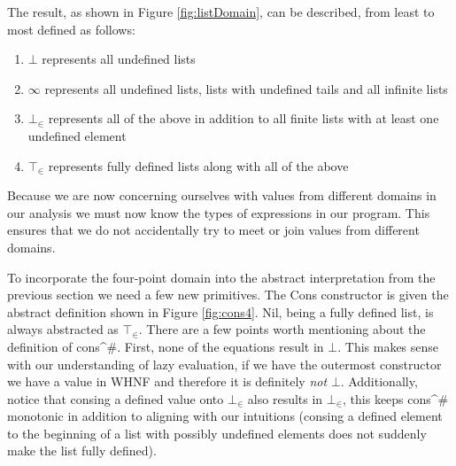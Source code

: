 The result, as shown in Figure \ref{fig:listDomain}, can be described, from least
to most defined as follows:

\begin{enumerate}
    \item $\bot$ represents all undefined lists
    \item $\infty$ represents all undefined lists, lists  with undefined tails
        and all infinite lists
    \item $\bot_{\in}$ represents all of the above in addition to all finite
        lists with at least one undefined element
    \item $\top_{\in}$ represents fully defined lists along with all of the above
\end{enumerate}


Because we are now concerning ourselves with values from different domains in
our analysis we must now know the types of expressions in our program. This
ensures that we do not accidentally try to \<meet\> or \<join\> values from
different domains. 

To incorporate the four-point domain into the abstract interpretation from the
previous section we need a few new primitives. The \<Cons\> constructor is
given the abstract definition shown in Figure \ref{fig:cons4}. \<Nil\>, being a
fully defined list, is always abstracted as $\top_{\in}$.  There are a few
points worth mentioning about the definition of \<cons^{\#}\>.  First, none of
the equations result in $\bot$.  This makes sense with our understanding of
lazy evaluation, if we have the outermost constructor we have a value in WHNF
and therefore it is definitely \emph{not} $\bot$. Additionally, notice that
\<cons\>ing a defined value onto $\bot_{\in}$ also results in $\bot_{\in}$,
this keeps \<cons^{\#}\> monotonic in addition to aligning with our intuitions
(\<cons\>ing a defined element to the beginning of a list with possibly
undefined elements does not suddenly make the list fully defined). 

